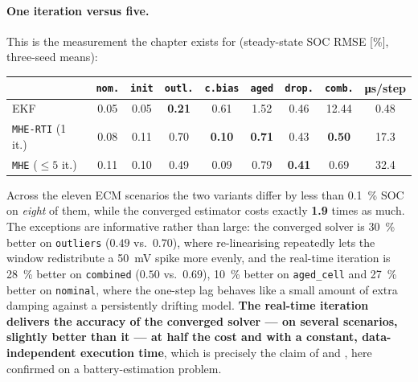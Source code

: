 \paragraph{One iteration versus five.}  This is the measurement the chapter exists for
(steady-state SOC RMSE [\si{\percent}], three-seed means):
\begin{center}
\begin{tabular}{@{}lcccccccc@{}}
\toprule
& \texttt{nom.} & \texttt{init} & \texttt{outl.} & \texttt{c.bias} & \texttt{aged} & \texttt{drop.} &
\texttt{comb.} & \si{\micro\second}/step \\
\midrule
EKF                      & 0.05 & 0.05 & \textbf{0.21} & 0.61 & 1.52 & 0.46 & 12.44 & \phantom{0}0.48 \\
\texttt{MHE-RTI} (1 it.) & 0.08 & 0.11 & 0.70 & \textbf{0.10} & \textbf{0.71} & 0.43 & \textbf{0.50} & 17.3 \\
\texttt{MHE} ($\le5$ it.)& 0.11 & 0.10 & 0.49 & 0.09 & 0.79 & \textbf{0.41} & 0.69 & 32.4 \\
\bottomrule
\end{tabular}
\end{center}
Across the eleven ECM scenarios the two variants differ by less than \SI{0.1}{\percent} SOC on
\emph{eight} of them, while the converged estimator costs exactly \textbf{1.9} times as much.  The
exceptions are informative rather than large: the converged solver is \SI{30}{\percent} better on
\texttt{outliers} ($0.49$ vs.\ $0.70$), where re-linearising repeatedly lets the window redistribute
a \SI{50}{\milli\volt} spike more evenly, and the real-time iteration is \SI{28}{\percent} better on
\texttt{combined} ($0.50$ vs.\ $0.69$), \SI{10}{\percent} better on \texttt{aged\_cell} and
\SI{27}{\percent} better on \texttt{nominal}, where the one-step lag behaves like a small amount of
extra damping against a persistently drifting model.  \textbf{The real-time iteration delivers the
accuracy of the converged solver --- on several scenarios, slightly better than it --- at half the
cost and with a constant, data-independent execution time}, which is precisely the claim of
\citet{diehl2005rti} and \citet{kuhl2011rtimhe}, here confirmed on a battery-estimation problem.

